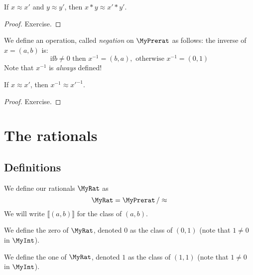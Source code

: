 \begin{lemma}
    \label{MyPrerat.mul_quotient}
    \leanok
If $x \approx x'$ and $y \approx y'$, then $x * y \approx x' * y'$.
\end{lemma}
\begin{proof}
\leanok
Exercise.
\end{proof}

\begin{definition}
    \label{MyPrerat.inv}
    \leanok
We define an operation, called \emph{negation} on $\MyPrerat$ as follows: the inverse of $x = (a,b)$ is:
\[
\mbox{if} b \neq 0 \mbox{ then } x^{-1} = (b, a), \mbox{ otherwise } x^{-1} = (0, 1)
\]
Note that $x^{-1}$ is \emph{always} defined!
\end{definition}

\begin{lemma}
    \label{MyPrerat.inv_quotient}
    \leanok
If $x \approx x'$, then $x^{-1} \approx x'^{-1}$.
\end{lemma}
\begin{proof}
\leanok
Exercise.
\end{proof}

\section{The rationals}

\subsection{Definitions}

\begin{definition}
    \label{MyRat}
    \leanok
    We define our rationals $\MyRat$ as
\[
\MyRat = \MyPrerat \, / \approx
\]
We will write $⟦ (a, b) ⟧$ for the class of $(a,b)$.
\end{definition}

\begin{definition}
    \label{MyRat.zero}
    \leanok
We define the zero of $\MyRat$, denoted $0$ as the class of $(0,1)$ (note that $1 \neq 0$ in $\MyInt$).
\end{definition}

\begin{definition}
    \label{MyRat.one}
    \leanok
We define the one of $\MyRat$, denoted $1$ as the class of $(1,1)$ (note that $1 \neq 0$ in $\MyInt$).
\end{definition}


